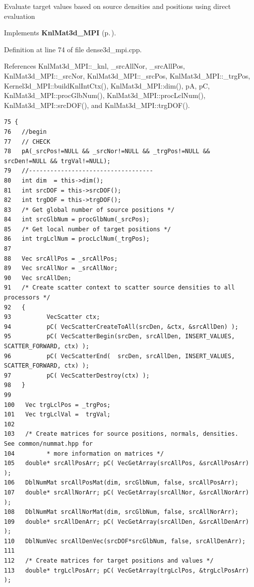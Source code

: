Evaluate target values based on source densities and positions using direct evaluation 

Implements {\bf Knl\-Mat3d\_\-MPI} {\rm (p.\,\pageref{classKnlMat3d__MPI_abf7f0a466fbc47db0804a35093c819f_abf7f0a466fbc47db0804a35093c819f})}.

Definition at line 74 of file dense3d\_\-mpi.cpp.

References Knl\-Mat3d\_\-MPI::\_\-knl, \_\-src\-All\-Nor, \_\-src\-All\-Pos, Knl\-Mat3d\_\-MPI::\_\-src\-Nor, Knl\-Mat3d\_\-MPI::\_\-src\-Pos, Knl\-Mat3d\_\-MPI::\_\-trg\-Pos, Kernel3d\_\-MPI::build\-Knl\-Int\-Ctx(), Knl\-Mat3d\_\-MPI::dim(), p\-A, p\-C, Knl\-Mat3d\_\-MPI::proc\-Glb\-Num(), Knl\-Mat3d\_\-MPI::proc\-Lcl\-Num(), Knl\-Mat3d\_\-MPI::src\-DOF(), and Knl\-Mat3d\_\-MPI::trg\-DOF().

\footnotesize\begin{verbatim}75 {
76   //begin
77   // CHECK
78   pA(_srcPos!=NULL && _srcNor!=NULL && _trgPos!=NULL && srcDen!=NULL && trgVal!=NULL);
79   //-----------------------------------
80   int dim  = this->dim();
81   int srcDOF = this->srcDOF();
82   int trgDOF = this->trgDOF();
83   /* Get global number of source positions */
84   int srcGlbNum = procGlbNum(_srcPos);
85   /* Get local number of target positions */
86   int trgLclNum = procLclNum(_trgPos);
87   
88   Vec srcAllPos = _srcAllPos;
89   Vec srcAllNor = _srcAllNor;
90   Vec srcAllDen;
91   /* Create scatter context to scatter source densities to all processors */
92   {
93          VecScatter ctx;
94          pC( VecScatterCreateToAll(srcDen, &ctx, &srcAllDen) );
95          pC( VecScatterBegin(srcDen, srcAllDen, INSERT_VALUES, SCATTER_FORWARD, ctx) );
96          pC( VecScatterEnd(  srcDen, srcAllDen, INSERT_VALUES, SCATTER_FORWARD, ctx) );
97          pC( VecScatterDestroy(ctx) );
98   }
99   
100   Vec trgLclPos = _trgPos;
101   Vec trgLclVal =  trgVal;
102 
103   /* Create matrices for source positions, normals, densities.  See common/nummat.hpp for
104         * more information on matrices */
105   double* srcAllPosArr; pC( VecGetArray(srcAllPos, &srcAllPosArr) );
106   DblNumMat srcAllPosMat(dim, srcGlbNum, false, srcAllPosArr);
107   double* srcAllNorArr; pC( VecGetArray(srcAllNor, &srcAllNorArr) );
108   DblNumMat srcAllNorMat(dim, srcGlbNum, false, srcAllNorArr);
109   double* srcAllDenArr; pC( VecGetArray(srcAllDen, &srcAllDenArr) );
110   DblNumVec srcAllDenVec(srcDOF*srcGlbNum, false, srcAllDenArr);
111 
112   /* Create matrices for target positions and values */
113   double* trgLclPosArr; pC( VecGetArray(trgLclPos, &trgLclPosArr) );

\end{verbatim}
